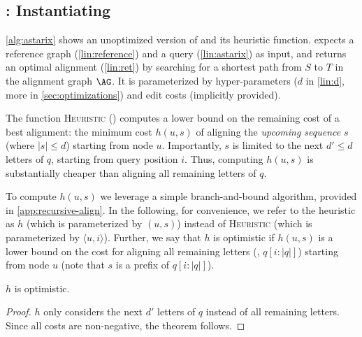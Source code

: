 


\subsection{\astarix: Instantiating \A} \label{subsec:astarix-heuristic}
\cref{alg:astarix} shows an unoptimized version of \astarix and its heuristic
function.
%
\astarix expects a reference graph (\cref{lin:reference}) and a query
(\cref{lin:astarix}) as input, and returns an optimal alignment (\cref{lin:ret})
by searching for a shortest path from $S$ to $T$ in the alignment graph $\AG$.
It is parameterized by hyper-parameters ($d$ in \cref{lin:d}, more in
\cref{sec:optimizations}) and edit costs (implicitly provided).

The function \textsc{Heuristic}
() computes a lower bound on
the remaining cost of a best alignment: the minimum cost $h(u,s)$ of aligning
the \emph{upcoming sequence} $s$ (where $\lvert s \rvert \leq d$) starting from
node $u$. Importantly, $s$ is limited to the next $d' \leq d$ letters of $q$,
starting from query position $i$. Thus, computing $h(u,s)$ is substantially
cheaper than aligning all remaining letters of $q$.

To compute $h(u,s)$ we leverage a simple branch-and-bound algorithm, provided in
\cref{app:recursive-align}. In the following, for convenience, we refer to the
heuristic as $h$ (which is parameterized by $(u,s)$) instead of
\textsc{Heuristic} (which is parameterized by $\langle u, i \rangle$). Further,
we say that $h$ is optimistic if $h(u,s)$ is a lower bound on the cost for
aligning all remaining letters (\ie, $q[i:|q|]$) starting from node $u$ (note
that $s$ is a prefix of $q[i:|q|]$).

\begin{samepage}
\begin{thm} \label{thm:optimistic}
	$h$ is optimistic.
\end{thm}
\begin{proof}
$h$ only considers the next $d'$ letters of $q$ instead of all
remaining letters. Since all costs are non-negative, the theorem follows.
\end{proof}
\end{samepage}

